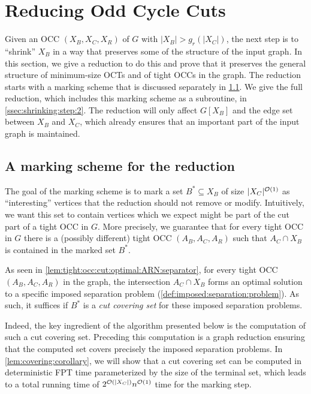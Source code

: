 \section{Reducing Odd Cycle Cuts} \label{sec:reduce:occ}

Given an OCC $(X_B, X_C, X_R)$ of $G$ with $|X_B| > g_r(|X_C|)$,
the next step is to ``shrink'' $X_B$ in a way that preserves some of the structure of the input graph. In this section, we give a reduction to do this and prove that it preserves the general structure of minimum-size OCTs and of tight OCCs in the graph. The reduction starts with a marking scheme that is discussed separately in \cref{ssec:shrinking:step:1}. We give the full reduction, which includes this marking scheme as a subroutine, in \cref{ssec:shrinking:step:2}. The reduction will only affect $G[X_B]$ and the edge set between $X_B$ and $X_C$, which already ensures that an important part of the input graph is maintained.


\subsection{A marking scheme for the reduction} \label{ssec:shrinking:step:1}
The goal of the marking scheme is to mark a set $B^\ast \subseteq X_B$ of size $|X_C|^{\mathcal{O}(1)}$ as ``interesting'' vertices that the reduction should not remove or modify. Intuitively, we want this set to contain vertices which we expect might be part of the cut part of a tight OCC in $G$. More precisely, we guarantee that for every tight OCC in $G$ there is a (possibly different) tight OCC $(A_B, A_C, A_R)$ such that $A_C \cap X_B$ is contained in the marked set $B^\ast$.

As seen in \cref{lem:tight:occ:cut:optimal:ARN:separator}, for every tight OCC $(A_B, A_C, A_R)$ in the graph, the intersection $A_C \cap X_B$ forms an optimal solution to a specific imposed separation problem (\cref{def:imposed:separation:problem}). As such, it suffices if $B^\ast$ is a \emph{cut covering set} for these imposed separation problems.

Indeed, the key ingredient of the algorithm presented below is the computation of such a cut covering set. Preceding this computation is a graph reduction ensuring that the computed set covers precisely the imposed separation problems. In \cref{lem:covering:corollary}, we will show that a cut covering set can be computed in deterministic FPT time parameterized by the size of the terminal set, which leads to a total running time of $2^{\mathcal{O}(|X_C|)} n^{\mathcal{O}(1)}$ time for the marking step. %

